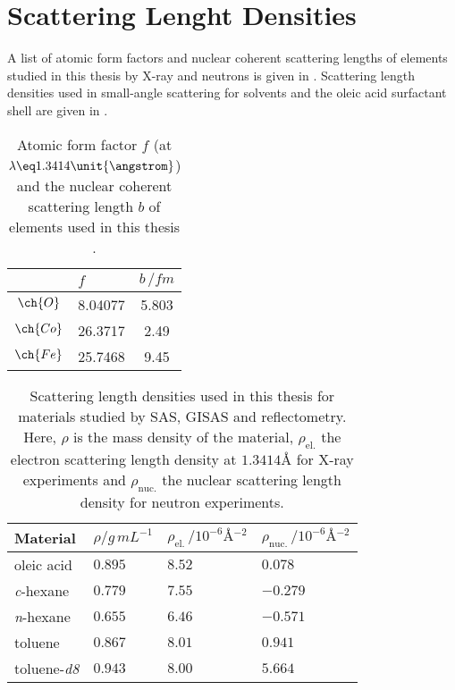 \documentclass[\main/dresen_thesis.tex]{subfiles}
\begin{document}
  \chapter{Scattering Lenght Densities}
  \label{appendix:slds}
  A list of atomic form factors and nuclear coherent scattering lengths of elements studied in this thesis by X-ray and neutrons is given in .
  Scattering length densities used in small-angle scattering for solvents and the oleic acid surfactant shell are given in .

  \begin{table}[ht]
    \centering
    \caption{\label{tab:appendix:affNuc}Atomic form factor $f$ (at $\lambda \eq 1.3414 \unit{\angstrom}$) and the nuclear coherent scattering length $b$ of elements used in this thesis \cite{Sears_1992_Neutr, BerkeleyLab_1993_asf}.}
    \begin{tabular}{ c | l | c }
                & $f$       & $b \, / \unit{fm}$ \\
      \hline
      $\ch{O}$  & 8.04077   & 5.803   \\
      $\ch{Co}$ & 26.3717   & 2.49  \\
      $\ch{Fe}$ & 25.7468   & 9.45  \\
      \hline
    \end{tabular}
  \end{table}

  \begin{table}[!htbp]
    \centering
    \caption{\label{tab:appendix:slds}Scattering length densities used in this thesis for materials studied by SAS, GISAS and reflectometry. Here, $\rho$ is the mass density of the material, $\rho_\mathrm{el.}$ the electron scattering length density at $1.3414 \unit{\angstrom}$ for X-ray experiments and $\rho_\mathrm{nuc.}$ the nuclear scattering length density for neutron experiments.}
    \begin{tabular}{ l | l | l | l }
      \textbf{Material}  & $\rho / \unit{g \, mL^{-1}}$ & $\rho_\mathrm{el.} \, / \unit{10^{-6} \angstrom^{-2}}$ & $\rho_\mathrm{nuc.} \, / \unit{10^{-6} \angstrom^{-2}}$\\
      \hline
      oleic acid               & $0.895$        & $8.52$       & $0.078$\\
      \textit{c}-hexane        & $0.779$        & $7.55$       & $-0.279$\\
      \textit{n}-hexane        & $0.655$        & $6.46$       & $-0.571$\\
      toluene                  & $0.867$        & $8.01$       & $0.941$\\
      toluene-\textit{d8}      & $0.943$        & $8.00$       & $5.664$\\
      \hline
    \end{tabular}
  \end{table}
\end{document}
